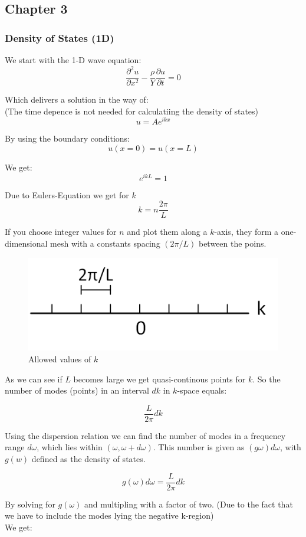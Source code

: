 \subsection{Chapter 3}

\subsubsection*{Density of States (1D)}

We start with the 1-D wave equation:
$$\frac{\partial^2 u}{\partial x^2} - \frac{\rho}{Y} \frac{\partial u}{\partial t} = 0$$

Which delivers a solution in the way of:\\
(The time depence is not needed for calculatiing the density of states)
\begin{equation}
    u = Ae^{ikx}
    \label{eq:sol_1d_wave}
\end{equation}

By using the boundary conditions:
$$u(x=0) = u(x=L)$$

We get:
$$e^{ikL} = 1$$

Due to Eulers-Equation we get for $k$
$$k = n \frac{2\pi}{L}$$

If you choose integer values for $n$ and plot them along a $k$-axis, they form
a one-dimensional mesh with a constants spacing $(2\pi/L)$ between the poins.

\begin{figure}[H]
	\centering
	\includegraphics[width=0.4\linewidth]{Graphics/Chapter3/allowed_values_k_1D}
	\caption{Allowed values of $k$}
	\label{}
\end{figure}

As we can see if $L$ becomes large we get quasi-continous points for $k$. So the 
number of modes (points) in an interval $dk$ in $k$-space equals:

$$\dfrac{L}{2\pi} dk$$

Using the dispersion relation we can find the number of modes in a frequency
range $d\omega$, which lies within $(\omega, \omega + d\omega)$.
This number is given as $(g\omega)d\omega$, with
$g(w)$ defined as the density of states.

$$g(\omega) d\omega =\dfrac{L}{2\pi} dk$$

By solving for $g(\omega)$ and multipling with a factor of two.
(Due to the fact that we have to include the modes lying the negative k-region)\\
We get:

